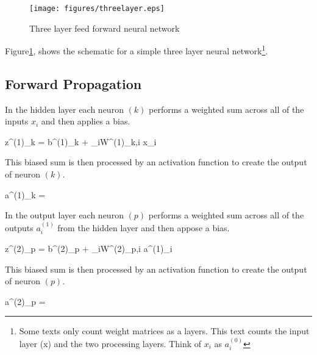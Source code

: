 \documentclass{article}
\newcommand{\VAR}[3]{#1^{(#2)}_{#3}}
\newcommand{\SUM}[2]{\displaystyle\sum_{#1}{#2}}
\begin{document}
\begin{figure}[h]
  \begin{center}
    \texttt{[image: figures/threelayer.eps]}
    \caption{Three layer feed forward neural network}
    \label{fig:threelayer}
  \end{center}
\end{figure}

Figure\ref{fig:threelayer}, shows the schematic for a simple three
layer neural network\footnote{Some texts only count weight matrices as
  a layers. This text counts the input layer (x) and the two
  processing layers. Think of $x_i$ as $a^{(0)}_i$}.

\subsection{Forward Propagation}

In the hidden layer each neuron $(k)$ performs a weighted sum across
all of the inputs $x_i$ and then applies a bias.

\begin{tcequation}
  \VAR{z}{1}{k} =  \VAR{b}{1}{k} + \SUM{i}{\VAR{W}{1}{k,i} \cdot x_i}
  \label{eq:sum1}
\end{tcequation}

This biased sum is then processed by an activation function to create
the output of neuron $(k)$.

\begin{tcequation}
  \VAR{a}{1}{k} = \FU{\sigma}{\VAR{z}{1}{k}}
  \label{eq:act1}
\end{tcequation}

In the output layer each neuron $(p)$ performs a weighted sum across
all of the outputs $\VAR{a}{1}{i}$ from the hidden layer and then
appose a bias.

\begin{tcequation}
  \VAR{z}{2}{p} = \VAR{b}{2}{p} + \SUM{i}{\VAR{W}{2}{p,i} \cdot \VAR{a}{1}{i}}
  \label{eq:sum2}
\end{tcequation}
  
This biased sum is then processed by an activation function to create
the output of neuron $(p)$.

\begin{tcequation}
  \VAR{a}{2}{p} = \FU{\sigma}{\VAR{z}{2}{p}}
  \label{eq:act2}
\end{tcequation}
\end{document}
